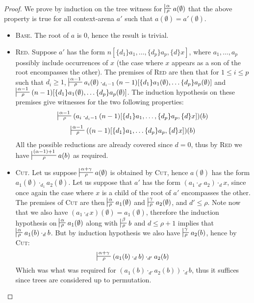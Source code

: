 \documentclass{article}
\begin{document}
\begin{proof}
We prove by induction on the tree witness for $\sststile{\rho}{\alpha} a(\emptyset)$ that the above property is true for all context-arena $a'$ such that $a(\emptyset) = a'(\emptyset)$.
\begin{itemize}
\item \textsc{Base.} The root of $a$ is $0$, hence the result is trivial.
\item \textsc{Red.} Suppose $a'$ has the form $n[\{d_1\}a_1, \dots, \{d_p\}a_p, \{d\}x]$, where $a_1, \dots, a_p$ possibly include occurrences of $x$ (the case where $x$ appears as a son
of the root encompasses the other). The premises of \textsc{Red} are then that for $1 \leq i \leq p$ such that
$d_i\geq 1$, $\sststile{\rho}{\alpha-1} a_i(\emptyset) \cdot_{d_i-1} (n-1)[\{d_1\}a_1(\emptyset), \dots \{d_p\}a_p(\emptyset)]$
and $\sststile{\rho}{\alpha-1} (n-1)[\{d_1\}a_1(\emptyset), \dots \{d_p\}a_p(\emptyset)]$. The induction hypothesis on these premises give witnesses for the two following properties:
\begin{eqnarray}
\sststile{\rho}{\alpha-1} (a_i \cdot_{d_i-1} (n-1)[\{d_1\}a_1, \dots, \{d_p\}a_p, \{d\}x])(b)\label{eq1}
\end{eqnarray}
\begin{eqnarray}
\sststile{\rho}{\alpha-1} ((n-1)[\{d_1\}a_1, \dots \{d_p\}a_p, \{d\}x])(b)\label{eq2}
\end{eqnarray}
All the possible reductions are already covered since $d=0$, thus by \textsc{Red} we have $\sststile{\rho}{(\alpha-1)+1} a(b)$ as required.
\item \textsc{Cut.} Let us suppose $\sststile{\rho}{\alpha+\gamma} a(\emptyset)$ is obtained by \textsc{Cut}, hence $a(\emptyset)$ has the form $a_1(\emptyset) \cdot_{d_1} a_2(\emptyset)$. Let us suppose
that $a'$ has the form $(a_1 \cdot_{d'} a_2) \cdot_d x$, since once again the case where $x$ is a child of the root of $a'$ encompasses the other. The premises of \textsc{Cut} are then
$\sststile{\rho}{\alpha} a_1(\emptyset)$ and $\sststile{\rho}{\gamma} a_2(\emptyset)$, and $d'\leq \rho$. Note now that we also have $(a_1 \cdot_d x)(\emptyset) = a_1(\emptyset)$, therefore
the induction hypothesis on $\sststile{\rho}{\alpha} a_1(\emptyset)$ along with $\sststile{\rho}{\beta} b$ and $d\leq \rho+1$ implies that
$\sststile{\rho}{\alpha} a_1(b) \cdot_d b$. But by induction hypothesis we also have $\sststile{\rho}{\gamma}a_2(b)$, hence by \textsc{Cut}:
\[
\sststile{\rho}{\alpha + \gamma} (a_1(b) \cdot_d b) \cdot_{d'} a_2(b)
\]
Which was what was required for $(a_1(b) \cdot_{d'} a_2(b)) \cdot_d b$, thus it suffices since trees are considered up to permutation.
\end{itemize}
\end{proof}
\end{document}
